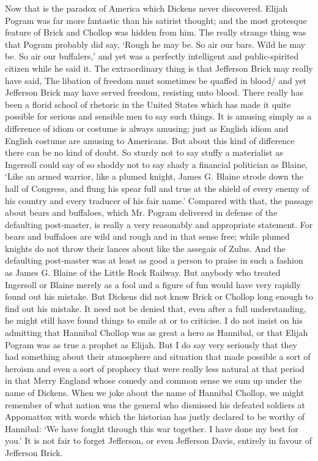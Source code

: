 \documentclass{book}
\begin{document}
Now that is the paradox of America which Dickens never discovered. Elijah Pogram was far more fantastic than his satirist thought; and the most grotesque feature of Brick and Chollop was hidden from him. The really strange thing was that Pogram probably did say, ‘Rough he may be. So air our bars. Wild he may be. So air our buffalers,’ and yet was a perfectly intelligent and public-spirited citizen while he said it. The extraordinary thing is that Jefferson Brick may really have said, The libation of freedom must sometimes be quaffed in blood/ and yet Jefferson Brick may have served freedom, resisting unto blood. There really has been a florid school of rhetoric in the United States which has made it quite possible for serious and sensible men to say such things. It is amusing simply as a difference of idiom or costume is always amusing; just as English idiom and English costume are amusing to Americans. But about this kind of difference there can be no kind of doubt. So sturdy not to say stuffy a materialist as Ingersoll could say of so shoddy not to say shady a financial politician as Blaine, ‘Like an armed warrior, like a plumed knight, James G. Blaine strode down the hall of Congress, and flung his spear full and true at the shield of every enemy of his country and every traducer of his fair name.’ Compared with that, the passage about bears and buffaloes, which Mr. Pogram delivered in defense of the defaulting post-master, is really a very reasonably and appropriate statement. For bears and buffaloes are wild and rough and in that sense free; while plumed knights do not throw their lances about like the assegais of Zulus. And the defaulting post-master was at least as good a person to praise in such a fashion as James G. Blaine of the Little Rock Railway. But anybody who treated Ingersoll or Blaine merely as a fool and a figure of fun would have very rapidly found out his mistake. But Dickens did not know Brick or Chollop long enough to find out his mistake. It need not be denied that, even after a full understanding, he might still have found things to smile at or to criticise. I do not insist on his admitting that Hannibal Chollop was as great a hero as Hannibal, or that Elijah Pogram was as true a prophet as Elijah. But I do say very seriously that they had something about their atmosphere and situation that made possible a sort of heroism and even a sort of prophecy that were really less natural at that period in that Merry England whose comedy and common sense we sum up under the name of Dickens. When we joke about the name of Hannibal Chollop, we might remember of what nation was the general who dismissed his defeated soldiers at Appomattox with words which the historian has justly declared to be worthy of Hannibal: ‘We have fought through this war together. I have done my best for you.’ It is not fair to forget Jefferson, or even Jefferson Davis, entirely in favour of Jefferson Brick.
\end{document}
